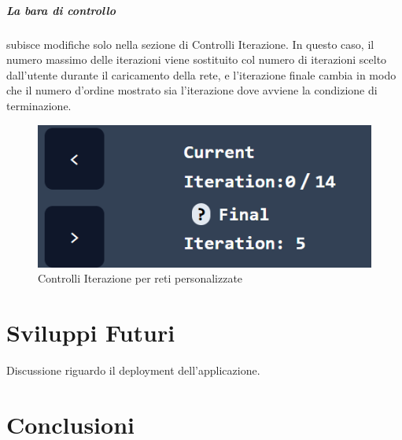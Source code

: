 \documentclass[a4paper,12pt]{report}
\begin{document}
			\paragraph*{La bara di controllo} subisce modifiche solo nella sezione di Controlli Iterazione. In questo caso, il numero massimo delle iterazioni viene sostituito col numero di iterazioni scelto dall'utente durante il caricamento della rete, e l'iterazione finale cambia in modo che il numero d'ordine mostrato sia l'iterazione dove avviene la condizione di terminazione.

			\begin{center}
				\begin{figure}[H]
				\centering
				\includegraphics[width=0.5\linewidth]{iterationcontrolcustom}
				\caption{Controlli Iterazione per reti personalizzate}
				\end{figure}
			\end{center}
\chapter{Sviluppi Futuri}
	Discussione riguardo il deployment dell'applicazione.
\chapter{Conclusioni}
\end{document}
